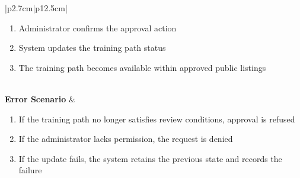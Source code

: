 \begin{table}[H]
\begin{tabular}{|p{2.7cm}|p{12.5cm}|}
\begin{minipage}[t]{\linewidth}
\begin{enumerate}[topsep=0pt,itemsep=1pt,parsep=0pt,partopsep=0pt]
                \item Administrator confirms the approval action
                \item System updates the training path status
                \item The training path becomes available within approved public listings
            \end{enumerate}
        \end{minipage}                                                                    \\
        \hline
        \textbf{Error Scenario} &
        \begin{minipage}[t]{\linewidth}
            \begin{enumerate}[topsep=0pt,itemsep=1pt,parsep=0pt,partopsep=0pt]
                \item If the training path no longer satisfies review conditions, approval is refused
                \item If the administrator lacks permission, the request is denied
                \item If the update fails, the system retains the previous state and records the
                      failure
            \end{enumerate}
        \end{minipage}                                                        \\
        \hline
    \end{tabular}
    \label{tab:admin-approve-training-path}
\end{table}
